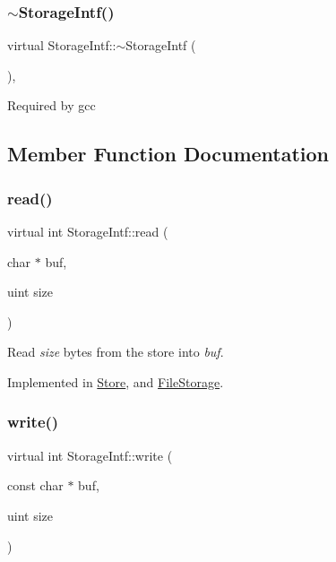 \subsubsection{\texorpdfstring{$\sim$StorageIntf()}{~StorageIntf()}}
{\footnotesize\ttfamily virtual Storage\+Intf\+::$\sim$\+Storage\+Intf (\begin{DoxyParamCaption}{ }\end{DoxyParamCaption})\hspace{0.3cm}{\ttfamily [inline]}, {\ttfamily [virtual]}}

Required by gcc 

\subsection{Member Function Documentation}
\mbox{\label{class_storage_intf_a125b99d1511364f4fe49709feec46bb4}} 
\subsubsection{\texorpdfstring{read()}{read()}}
{\footnotesize\ttfamily virtual int Storage\+Intf\+::read (\begin{DoxyParamCaption}\item[{char $\ast$}]{buf,  }\item[{uint}]{size }\end{DoxyParamCaption})\hspace{0.3cm}{\ttfamily [pure virtual]}}

Read {\itshape size} bytes from the store into {\itshape buf}. 

Implemented in \mbox{\hyperlink{class_store_a02df7a98367838e436f8f8b3367016d1}{Store}}, and \mbox{\hyperlink{class_file_storage_ae28163449c4c40730b5e27b75362e22d}{File\+Storage}}.

\mbox{\label{class_storage_intf_a97b26023c6cf0590423e428947d6febb}} 
\subsubsection{\texorpdfstring{write()}{write()}}
{\footnotesize\ttfamily virtual int Storage\+Intf\+::write (\begin{DoxyParamCaption}\item[{const char $\ast$}]{buf,  }\item[{uint}]{size }\end{DoxyParamCaption})\hspace{0.3cm}{\ttfamily [pure virtual]}}

